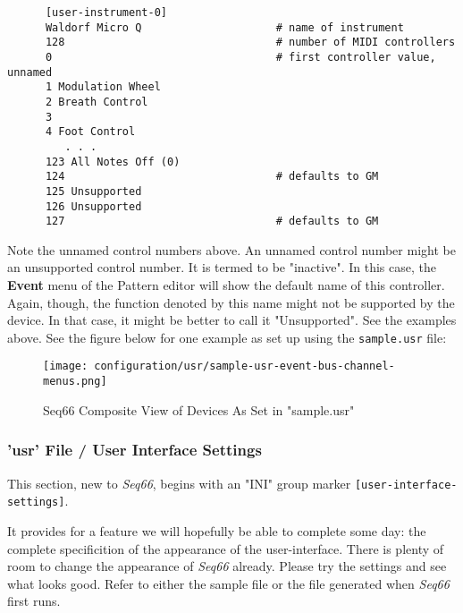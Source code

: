    \begin{verbatim}
      [user-instrument-0]
      Waldorf Micro Q                     # name of instrument
      128                                 # number of MIDI controllers
      0                                   # first controller value, unnamed
      1 Modulation Wheel
      2 Breath Control
      3 
      4 Foot Control
         . . .
      123 All Notes Off (0)
      124                                 # defaults to GM
      125 Unsupported
      126 Unsupported
      127                                 # defaults to GM
   \end{verbatim}

   Note the unnamed control numbers above.
   An unnamed control number might be an unsupported control number.
   It is termed to be "inactive".  In this case, the \textbf{Event} menu of
   the Pattern editor will show the default name of this controller.
   Again, though, the function denoted by this name might not be supported by
   the device.  In that case, it might be better to call it "Unsupported".
   See the examples above.  See the figure below for one example as set up using
   the \texttt{sample.usr} file:

\begin{figure}[H]
   \centering 
   \texttt{[image: configuration/usr/sample-usr-event-bus-channel-menus.png]}
   \caption{Seq66 Composite View of Devices As Set in "sample.usr"}
   \label{fig:sample_usr_event_bus_channel_menus}
\end{figure}

\subsubsection{'usr' File / User Interface Settings}
\label{subsubsec:usr_file_user_interface_settings}

   This section, new to \textsl{Seq66}, begins with an
   "INI" group marker \texttt{[user-interface-settings]}.

   It provides for a feature we will hopefully be able to complete some day:
   the complete specificition of the appearance of the user-interface.
   There is plenty of room to change the appearance of
   \textsl{Seq66} already.
   Please try the settings and see what looks good.
   Refer to either the sample file or the file generated when \textsl{Seq66}
   first runs.

